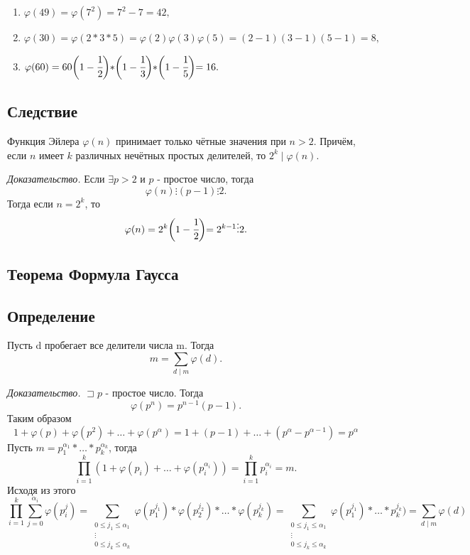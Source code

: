 \documentclass[12pt]{article}
\begin{document}
\begin{enumerate}
    \item $\varphi(49)=\varphi(7^{2})=7^{2}-7=42,$
    \item $\varphi(30)=\varphi(2*3*5)=\varphi(2)\varphi(3)\varphi(5)=(2-1)(3-1)(5-1)=8,$ 
    \item $\varphi(60)=60\biggl(1-\cfrac{1}{2}\biggl)*\biggl(1-\cfrac{1}{3}\biggl)*\biggl(1-\cfrac{1}{5}\biggl)=16.$
\end{enumerate}

\subsection{Следствие} Функция Эйлера $\varphi(n)$ принимает только чётные значения при $n>2$. Причём, если $n$ имеет $k$ различных нечётных простых делителей, то $2^{k}\mid\varphi(n)$.
\par \textit{Доказательство.} Если $\exists p>2$ и $p$ - простое число, тогда \[\varphi(n)\vdots(p-1)\vdots2.\] Тогда если $n=2^{k}$, то \[\varphi(n)=2^{k}\biggl(1-\cfrac{1}{2}\biggl)=2^{k-1}\vdots2.\]

\subsection{Теорема Формула Гаусса}
\subsection{Определение} Пусть d пробегает все делители числа m. Тогда \[m=\sum_{d\mid m}\varphi(d).\]
\par \textit{Доказательство.} $\sqsupset p$ - простое число. Тогда \[\varphi(p^{n})=p^{n-1}(p-1).\] Таким образом \[1+\varphi(p)+\varphi(p^{2})+\dots+\varphi(p^{\alpha})=1+(p-1)+\dots+(p^{\alpha}-p^{\alpha-1})=p^{\alpha}\] Пусть $m=p^{\alpha_{1}}_{1}*\dots*p^{\alpha_{k}}_{k}$, тогда \[\prod^{k}_{i=1}(1+\varphi(p_{i})+\dots+\varphi(p^{\alpha_{i}}_{i}))=\prod^{k}_{i=1}p^{\alpha_{i}}_{i}=m.\] Исходя из этого \[\prod^{k}_{i=1}\sum^{\alpha_{i}}_{j=0}\varphi(p^{j}_{i})=\sum_{\substack{
    0\leq j_{1}\leq \alpha_{1} \\
    \vdots \\
    0\leq j_{k}\leq \alpha_{k}
}}\varphi(p^{j_{1}}_{1})*\varphi(p^{j_{2}}_{2})*\dots*\varphi(p^{j_{k}}_{k})=\sum_{\substack{
    0\leq j_{1}\leq \alpha_{1} \\
    \vdots \\
    0\leq j_{k}\leq \alpha_{k}
}}\varphi(p^{j_{1}}_{1})*\dots*p^{j_{k}}_{k})=\sum_{d\mid m}\varphi(d)\]
\end{document}
